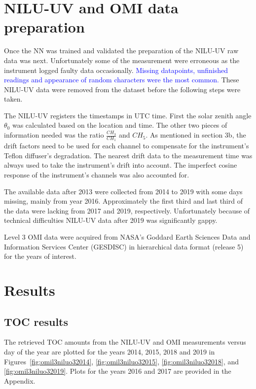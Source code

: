 \documentclass{optica-article}
\begin{document}

\section{NILU-UV and OMI data preparation}
\label{sec-dataprep}

Once the NN was trained and validated the preparation of the NILU-UV raw data was next.  
Unfortunately some of the measurement were erroneous as the instrument logged faulty data occasionally. \textcolor{blue}{Missing datapoints, unfinished readings and appearance of random characters were the most common.}
These NILU-UV data were removed from the dataset before the following steps were taken.

The NILU-UV registers the timestamps in UTC time.
First the solar zenith angle $\theta_0$ was calculated based on the location and time. 
The other two pieces of information needed was the ratio $\frac{CH_3}{CH_1}$ and $CH_5$.
As mentioned in \cite{Sztipanov:20} section 3b, the drift factors need to be used for each channel to compensate for the instrument's Teflon diffuser's degradation. 
The nearest drift data to the measurement time was always used to take the instrument's drift into account.
The imperfect cosine response of the instrument's channels was also accounted for.

The available data after 2013 were collected from 2014 to 2019 with some days missing, mainly from year 2016.
Approximately the first third and last third of the data were lacking from 2017 and 2019, respectively.
Unfortunately because of technical difficulties NILU-UV data after 2019 was significantly gappy. 

Level 3 OMI data were acquired from NASA's Goddard Earth Sciences Data and Information Services Center (GESDISC) in hierarchical data format (release 5) for the years of interest.

\section{Results}
\label{sec-results}

\subsection{TOC results}

The retrieved TOC amounts from the NILU-UV and OMI measurements versus day of the year are plotted for the years 2014, 2015, 2018 and 2019 in Figures~\ref{fig:omil3niluo32014}, \ref{fig:omil3niluo32015}, \ref{fig:omil3niluo32018}, and \ref{fig:omil3niluo32019}. 
Plots for the years 2016 and 2017 are provided in the Appendix.\\
\end{document}
